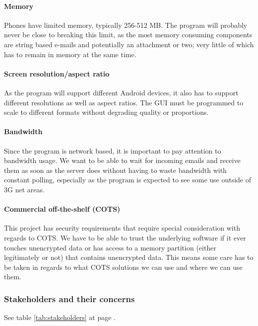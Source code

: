 \paragraph{Memory}\hfill
\newline
Phones have limited memory, typically 256-512 MB. The program will probably never be close to breaking this limit, as the most memory consuming components are string based e-mails and potentially an attachment or two; very little of which has to remain in memory at the same time.

\paragraph{Screen resolution/aspect ratio} \hfill
\newline
As the program will support different Android devices, it also has to support different resolutions as well as aspect ratios. The GUI must be programmed to scale to different formats without degrading quality or proportions.

\paragraph{Bandwidth} \hfill
\newline
Since the program is network based, it is important to pay attention to bandwidth usage. We want to be able to wait for incoming emails and receive them as soon as the server does without having to waste bandwidth with constant polling, especially as the program is expected to see some use outside of 3G net areas.

\paragraph{Commercial off-the-shelf (COTS)} \hfill
\newline
This project has security requirements that require special consideration with regards to COTS. We have to be able to trust the underlying software if it ever touches unencrypted data or has access to a memory partition (either legitimately or not) that contains unencrypted data. This means some care has to be taken in regards to what COTS solutions we can use and where we can use them. 

\subsubsection{Stakeholders and their concerns}
See table \ref{tab:stakeholders} at page \pageref{tab:stakeholders}.

